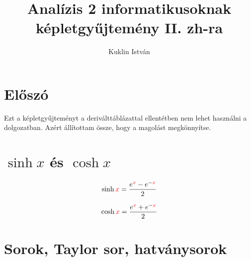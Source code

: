 \documentclass[a4paper,12pt]{article}
\begin{document}
\renewcommand{\arraystretch}{1.2}


\newcommand{\n}{\ensuremath{\textcolor{blue}{n}}}
\renewcommand{\k}{\ensuremath{\textcolor{PineGreen}{k}}}
\newcommand{\x}{\ensuremath{\textcolor{red}{x}}}
\renewcommand{\u}{\ensuremath{\textcolor{darkgreen}{u}}}
\renewcommand{\c}{\ensuremath{\textcolor{Sepia}{c}}}
\newcommand{\q}{\ensuremath{\textcolor{SkyBlue}{q}}}

\newcommand{\sumi}{\ensuremath{\sum_{\n= 0}^{\infty}}}

\title{Analízis 2 informatikusoknak képletgyűjtemény II. zh-ra}
\author{Kuklin István}

\maketitle

\tableofcontents

\newpage
\boldmath

\section{Előszó}
Ezt a képletgyűjteményt a deriválttáblázattal ellentétben nem lehet használni a dolgozatban. Azért állítottam össze, hogy a magolást megkönnyítse.

\section{$\sinh x$ és $\cosh x$}
\begin{minipage}{0.5\textwidth}
\begin{equation}
\sinh \x = \frac{e^{\x} - e^{-\x}}{2}
\end{equation}
\end{minipage}
\begin{minipage}{0.5\textwidth}
\begin{equation}
\cosh \x = \frac{e^{\x} + e^{-\x}}{2}
\end{equation}
\end{minipage}

\section{Sorok, Taylor sor, hatványsorok}
\end{document}
